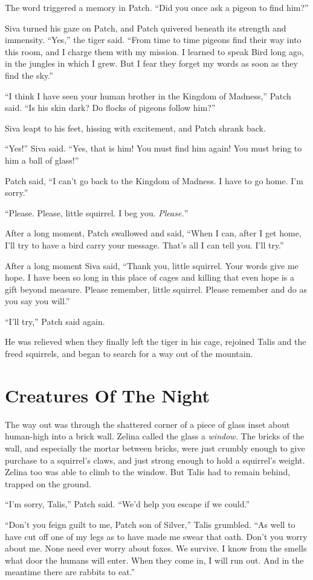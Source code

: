 \documentclass[ebook,oneside,openany,17pt]{memoir}
\renewcommand{\thechapter}{\Roman{chapter}}
\newcounter{sections}
\newcommand{\sections}[1]{%
  \section*{#1}
  \addtocounter{sections}{1}%
  \pdfbookmark[1]{#1}{section.\thechapter.\thesections}}
\begin{document}
The word triggered a memory in Patch. “Did you once ask a pigeon to
find him?”

Siva turned his gaze on Patch, and Patch quivered beneath its strength
and immensity. “Yes,” the tiger said. “From time to time pigeons find
their way into this room, and I charge them with my mission. I learned
to speak Bird long ago, in the jungles in which I grew. But I fear
they forget my words as soon as they find the sky.”

“I think I have seen your human brother in the Kingdom of Madness,”
Patch said. “Is his skin dark? Do flocks of pigeons follow him?”

Siva leapt to his feet, hissing with excitement, and Patch shrank
back.

“Yes!” Siva said. “Yes, that is him! You must find him again! You must
bring to him a ball of glass!”

Patch said, “I can’t go back to the Kingdom of Madness. I have to go
home. I’m sorry.”

“Please. Please, little squirrel. I beg you. \emph{Please.}”

After a long moment, Patch swallowed and said, “When I can, after I
get home, I’ll try to have a bird carry your message. That’s all I can
tell you. I’ll try.”

After a long moment Siva said, “Thank you, little squirrel. Your words
give me hope. I have been so long in this place of cages and killing
that even hope is a gift beyond measure. Please remember, little
squirrel. Please remember and do as you say you will.”

“I’ll try,” Patch said again.

He was relieved when they finally left the tiger in his cage, rejoined
Talis and the freed squirrels, and began to search for a way out of
the mountain.


\sections{Creatures Of The Night}

The way out was through the shattered corner of a piece of glass inset
about human-high into a brick wall. Zelina called the glass a
\emph{window.} The bricks of the wall, and especially the mortar
between bricks, were just crumbly enough to give purchase to a
squirrel’s claws, and just strong enough to hold a squirrel’s
weight. Zelina too was able to climb to the window. But Talis had to
remain behind, trapped on the ground.

“I’m sorry, Talis,” Patch said. “We’d help you escape if we could.”

“Don’t you feign guilt to me, Patch son of Silver,” Talis
grumbled. “As well to have cut off one of my legs as to have made me
swear that oath. Don’t you worry about me. None need ever worry about
foxes. We survive. I know from the smells what door the humans will
enter. When they come in, I will run out. And in the meantime there
are rabbits to eat.”
\end{document}
